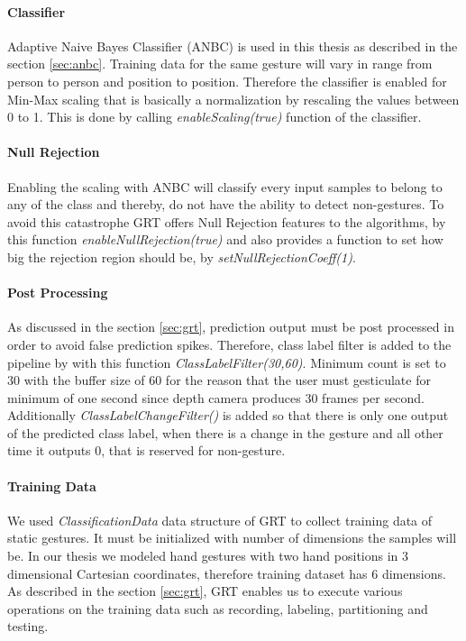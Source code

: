 \paragraph*{Classifier} Adaptive Naive Bayes Classifier (ANBC) is used in this thesis as described in the section \ref{sec:anbc}. Training data for the same gesture will vary in range from person to person and position to position. Therefore the classifier is enabled for Min-Max scaling that is basically a normalization by rescaling the values between 0 to 1. This is done by calling \textit{enableScaling(true)} function of the classifier.

\paragraph*{Null Rejection} Enabling the scaling with ANBC will classify every input samples to belong to any of the class and thereby, do not have the ability to detect non-gestures. To avoid this catastrophe GRT offers Null Rejection features to the algorithms, by this function \textit{enableNullRejection(true)} and also provides a function to set how big the rejection region should be, by \textit{setNullRejectionCoeff(1)}.

\paragraph*{Post Processing} As discussed in the section \ref{sec:grt}, prediction output must be post processed in order to avoid false prediction spikes. Therefore, class label filter is added to the pipeline by with this function \textit{ClassLabelFilter(30,60)}. Minimum count is set to 30 with the buffer size of 60 for the reason that the user must gesticulate for minimum of one second since depth camera produces 30 frames per second. Additionally \textit{ClassLabelChangeFilter()} is added so that there is only one output of the predicted class label, when there is a change in the gesture and all other time it outputs 0, that is reserved for non-gesture.

\paragraph*{Training Data} We used \textit{ClassificationData} data structure of GRT to collect training data of static gestures. It must be initialized with number of dimensions the samples will be. In our thesis we modeled hand gestures with two hand positions in 3 dimensional Cartesian coordinates, therefore training dataset has 6 dimensions. As described in the section \ref{sec:grt}, GRT enables us to execute various operations on the training data such as recording, labeling, partitioning and testing. 

